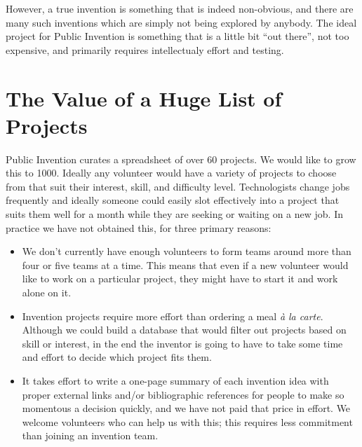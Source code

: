 \documentclass[
	fontsize=10pt, %
	twoside=false, %
	secnumdepth=1, %
]{kaobook}
\begin{document}
However, a true invention is something that is indeed non-obvious, and there
are many such inventions which are simply not being explored by anybody.
The ideal project for Public Invention is something that is a
little bit ``out there'', not too expensive, and primarily requires
intellectualy effort and testing.



\section{The Value of a Huge List of Projects}


Public Invention curates a spreadsheet of over 60 projects.
We would like to grow this to 1000. Ideally any volunteer
would have a variety of projects to choose from that suit
their interest, skill, and difficulty level.
Technologists change jobs frequently and ideally someone
could easily slot effectively into a project that suits them well for a
month while they are seeking or waiting on a new job.
In practice we have not obtained this, for three primary
reasons:
\begin{itemize}
\item We don't currently have enough volunteers to form teams around
  more than four or five teams at a time. This means that even
  if a new volunteer would like to work on a particular project,
  they might have to start it and work alone on it.
\item Invention projects require more effort than ordering a meal {\em à la carte}.
  Although we could build a database that would filter out projects based on
  skill or interest, in the end the inventor is going to have to take some
  time and effort to decide which project fits them.
\item It takes effort to write a one-page summary of each invention
  idea with proper external links and/or bibliographic references for
  people to make so momentous a decision quickly, and we have not paid
  that price in effort. We welcome volunteers who can help us with this;
  this requires less commitment than joining an invention team.
  \end{itemize}
\end{document}
